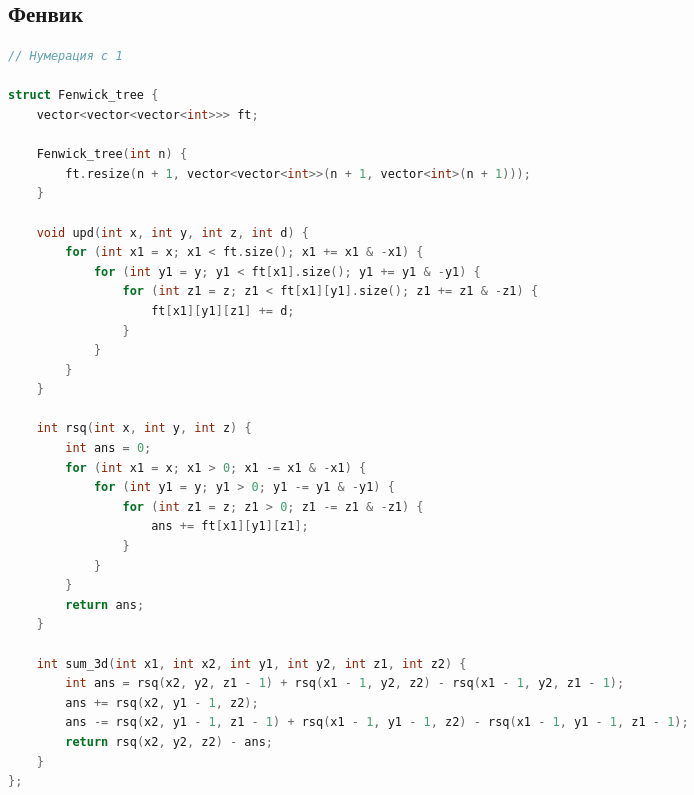 \documentclass[10pt,a4paper,landscape,twosided]{extarticle}
\begin{document}
\begin{multicols*}{3}
\begin{lstlisting}[language=C++]
\end{lstlisting}

\subsection{Фенвик}
\begin{lstlisting}[language=C++]
// Нумерация с 1

struct Fenwick_tree {
    vector<vector<vector<int>>> ft;

    Fenwick_tree(int n) {
        ft.resize(n + 1, vector<vector<int>>(n + 1, vector<int>(n + 1)));
    }

    void upd(int x, int y, int z, int d) {
        for (int x1 = x; x1 < ft.size(); x1 += x1 & -x1) {
            for (int y1 = y; y1 < ft[x1].size(); y1 += y1 & -y1) {
                for (int z1 = z; z1 < ft[x1][y1].size(); z1 += z1 & -z1) {
                    ft[x1][y1][z1] += d;
                }
            }
        }
    }

    int rsq(int x, int y, int z) {
        int ans = 0;
        for (int x1 = x; x1 > 0; x1 -= x1 & -x1) {
            for (int y1 = y; y1 > 0; y1 -= y1 & -y1) {
                for (int z1 = z; z1 > 0; z1 -= z1 & -z1) {
                    ans += ft[x1][y1][z1];
                }
            }
        }
        return ans;
    }

    int sum_3d(int x1, int x2, int y1, int y2, int z1, int z2) {
        int ans = rsq(x2, y2, z1 - 1) + rsq(x1 - 1, y2, z2) - rsq(x1 - 1, y2, z1 - 1);
        ans += rsq(x2, y1 - 1, z2);
        ans -= rsq(x2, y1 - 1, z1 - 1) + rsq(x1 - 1, y1 - 1, z2) - rsq(x1 - 1, y1 - 1, z1 - 1);
        return rsq(x2, y2, z2) - ans;
    }
};

\end{lstlisting}


\end{multicols*}
\end{document}
